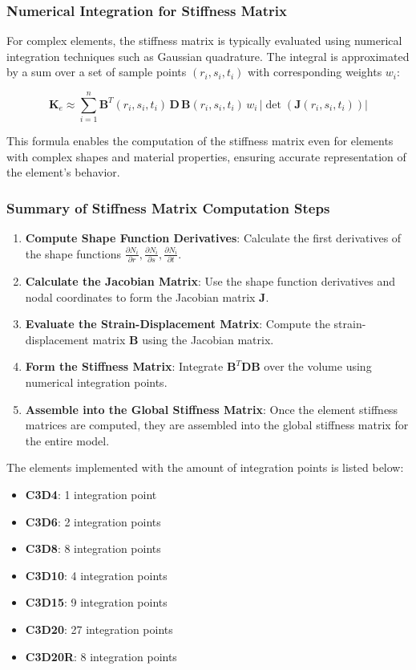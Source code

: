 \subsubsection{Numerical Integration for Stiffness Matrix}

For complex elements, the stiffness matrix is typically evaluated using numerical integration techniques such as Gaussian quadrature. The integral is approximated by a sum over a set of sample points \((r_i, s_i, t_i)\) with corresponding weights \( w_i \):

\[
\mathbf{K}_e \approx \sum_{i=1}^{n} \mathbf{B}^T(r_i, s_i, t_i) \, \mathbf{D} \, \mathbf{B}(r_i, s_i, t_i) \, w_i \, \left| \det(\mathbf{J}(r_i, s_i, t_i)) \right|
\]

This formula enables the computation of the stiffness matrix even for elements with complex shapes and material properties, ensuring accurate representation of the element's behavior.

\subsubsection{Summary of Stiffness Matrix Computation Steps}

\begin{enumerate}
    \item \textbf{Compute Shape Function Derivatives}: Calculate the first derivatives of the shape functions \( \frac{\partial N_i}{\partial r}, \frac{\partial N_i}{\partial s}, \frac{\partial N_i}{\partial t} \).
    \item \textbf{Calculate the Jacobian Matrix}: Use the shape function derivatives and nodal coordinates to form the Jacobian matrix \( \mathbf{J} \).
    \item \textbf{Evaluate the Strain-Displacement Matrix}: Compute the strain-displacement matrix \( \mathbf{B} \) using the Jacobian matrix.
    \item \textbf{Form the Stiffness Matrix}: Integrate \( \mathbf{B}^T \mathbf{D} \mathbf{B} \) over the volume using numerical integration points.
    \item \textbf{Assemble into the Global Stiffness Matrix}: Once the element stiffness matrices are computed, they are assembled into the global stiffness matrix for the entire model.
\end{enumerate}

The elements implemented with the amount of integration points is listed below:

\begin{itemize}
    \item \textbf{C3D4}: 1 integration point
    \item \textbf{C3D6}: 2 integration points
    \item \textbf{C3D8}: 8 integration points
    \item \textbf{C3D10}: 4 integration points
    \item \textbf{C3D15}: 9 integration points
    \item \textbf{C3D20}: 27 integration points
    \item \textbf{C3D20R}: 8 integration points
\end{itemize}


